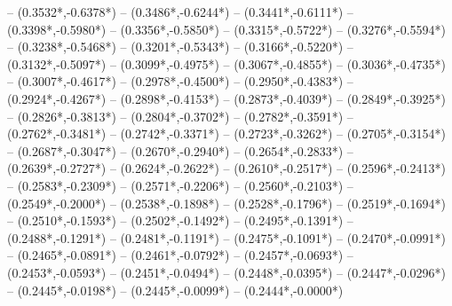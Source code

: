 {	-- ({0.3532*\dx},{-0.6378*\dy})
	-- ({0.3486*\dx},{-0.6244*\dy})
	-- ({0.3441*\dx},{-0.6111*\dy})
	-- ({0.3398*\dx},{-0.5980*\dy})
	-- ({0.3356*\dx},{-0.5850*\dy})
	-- ({0.3315*\dx},{-0.5722*\dy})
	-- ({0.3276*\dx},{-0.5594*\dy})
	-- ({0.3238*\dx},{-0.5468*\dy})
	-- ({0.3201*\dx},{-0.5343*\dy})
	-- ({0.3166*\dx},{-0.5220*\dy})
	-- ({0.3132*\dx},{-0.5097*\dy})
	-- ({0.3099*\dx},{-0.4975*\dy})
	-- ({0.3067*\dx},{-0.4855*\dy})
	-- ({0.3036*\dx},{-0.4735*\dy})
	-- ({0.3007*\dx},{-0.4617*\dy})
	-- ({0.2978*\dx},{-0.4500*\dy})
	-- ({0.2950*\dx},{-0.4383*\dy})
	-- ({0.2924*\dx},{-0.4267*\dy})
	-- ({0.2898*\dx},{-0.4153*\dy})
	-- ({0.2873*\dx},{-0.4039*\dy})
	-- ({0.2849*\dx},{-0.3925*\dy})
	-- ({0.2826*\dx},{-0.3813*\dy})
	-- ({0.2804*\dx},{-0.3702*\dy})
	-- ({0.2782*\dx},{-0.3591*\dy})
	-- ({0.2762*\dx},{-0.3481*\dy})
	-- ({0.2742*\dx},{-0.3371*\dy})
	-- ({0.2723*\dx},{-0.3262*\dy})
	-- ({0.2705*\dx},{-0.3154*\dy})
	-- ({0.2687*\dx},{-0.3047*\dy})
	-- ({0.2670*\dx},{-0.2940*\dy})
	-- ({0.2654*\dx},{-0.2833*\dy})
	-- ({0.2639*\dx},{-0.2727*\dy})
	-- ({0.2624*\dx},{-0.2622*\dy})
	-- ({0.2610*\dx},{-0.2517*\dy})
	-- ({0.2596*\dx},{-0.2413*\dy})
	-- ({0.2583*\dx},{-0.2309*\dy})
	-- ({0.2571*\dx},{-0.2206*\dy})
	-- ({0.2560*\dx},{-0.2103*\dy})
	-- ({0.2549*\dx},{-0.2000*\dy})
	-- ({0.2538*\dx},{-0.1898*\dy})
	-- ({0.2528*\dx},{-0.1796*\dy})
	-- ({0.2519*\dx},{-0.1694*\dy})
	-- ({0.2510*\dx},{-0.1593*\dy})
	-- ({0.2502*\dx},{-0.1492*\dy})
	-- ({0.2495*\dx},{-0.1391*\dy})
	-- ({0.2488*\dx},{-0.1291*\dy})
	-- ({0.2481*\dx},{-0.1191*\dy})
	-- ({0.2475*\dx},{-0.1091*\dy})
	-- ({0.2470*\dx},{-0.0991*\dy})
	-- ({0.2465*\dx},{-0.0891*\dy})
	-- ({0.2461*\dx},{-0.0792*\dy})
	-- ({0.2457*\dx},{-0.0693*\dy})
	-- ({0.2453*\dx},{-0.0593*\dy})
	-- ({0.2451*\dx},{-0.0494*\dy})
	-- ({0.2448*\dx},{-0.0395*\dy})
	-- ({0.2447*\dx},{-0.0296*\dy})
	-- ({0.2445*\dx},{-0.0198*\dy})
	-- ({0.2445*\dx},{-0.0099*\dy})
	-- ({0.2444*\dx},{-0.0000*\dy})
}
